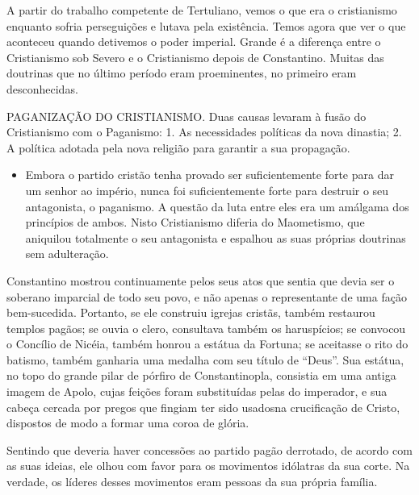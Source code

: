 \documentclass[11pt,a5paper,twoside,openany]{book}
\begin{document}
A partir do trabalho competente de Tertuliano, vemos o que era o cristianismo enquanto sofria perseguições e lutava pela existência. Temos agora que ver o que aconteceu quando detivemos o poder imperial. Grande é a diferença entre o Cristianismo sob Severo e o Cristianismo depois de Constantino. Muitas das doutrinas que no último período eram proeminentes, no primeiro eram desconhecidas.

PAGANIZAÇÃO DO CRISTIANISMO. Duas causas levaram à fusão do Cristianismo com o Paganismo: 1. As necessidades políticas da nova dinastia; 2. A política adotada pela nova religião para garantir a sua propagação.

\begin{itemize}
\item Embora o partido cristão tenha provado ser suficientemente forte para dar um senhor ao império, nunca foi suficientemente forte para destruir o seu antagonista, o paganismo. A questão da luta entre eles era um amálgama dos princípios de ambos. Nisto Cristianismo diferia do Maometismo, que aniquilou totalmente o seu antagonista e espalhou as suas próprias doutrinas sem adulteração.
\end{itemize}
Constantino mostrou continuamente pelos seus atos que sentia que devia ser o soberano imparcial de todo seu povo, e não apenas o representante de uma fação bem-sucedida. Portanto, se ele construiu igrejas cristãs, também restaurou templos pagãos; se ouvia o clero, consultava também os haruspícios; se convocou o Concílio de Nicéia, também honrou a estátua da Fortuna; se aceitasse o rito do batismo, também ganharia uma medalha com seu título de “Deus”. Sua estátua, no topo do grande pilar de pórfiro de Constantinopla, consistia em uma antiga imagem de Apolo, cujas feições foram substituídas pelas do imperador, e sua cabeça cercada por pregos que fingiam ter sido usados ​​na crucificação de Cristo, dispostos de modo a formar uma coroa de glória.

Sentindo que deveria haver concessões ao partido pagão derrotado, de acordo com as suas ideias, ele olhou com favor para os movimentos idólatras da sua corte. Na verdade, os líderes desses movimentos eram pessoas da sua própria família.
\end{document}
